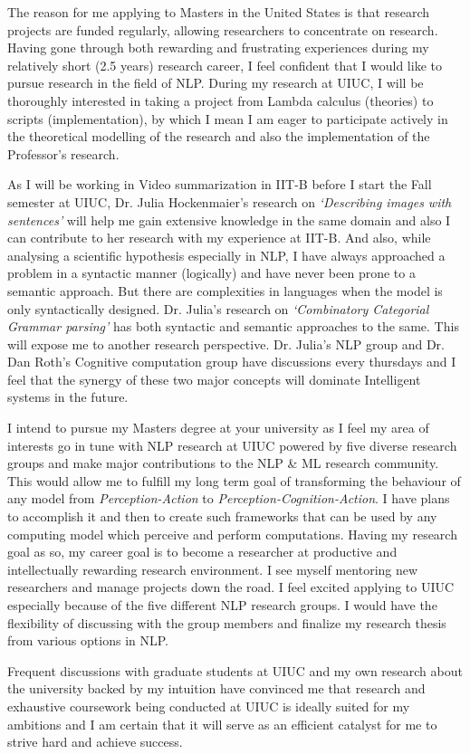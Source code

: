 \documentclass[letterpaper]{article}
\begin{document}
The reason for me applying to Masters in the United States is that research projects are funded regularly, allowing researchers to concentrate on research. Having gone through both rewarding and frustrating experiences during my relatively short (2.5 years) research career, I feel confident that I would like to pursue research in the field of NLP. During my research at UIUC, I will be thoroughly interested in taking a project from Lambda calculus (theories) to scripts (implementation), by which I mean I am eager to participate actively in the theoretical modelling of the research and also the implementation of the Professor's research.\\ \par


As I will be working in Video summarization in IIT-B before I start the Fall semester at UIUC, Dr. Julia Hockenmaier’s research on \textit{‘Describing images with sentences’} will help me gain extensive knowledge in the same domain and also I can contribute to her research with my experience at IIT-B. And also, while analysing a scientific hypothesis especially in NLP, I have always approached a problem in a syntactic manner (logically) and have never been prone to a semantic approach. But there are complexities in languages when the model is only syntactically designed. Dr. Julia’s research on \textit{‘Combinatory Categorial Grammar parsing’} has both syntactic and semantic approaches to the same. This will expose me to another research perspective. Dr. Julia’s  NLP group and Dr. Dan Roth’s Cognitive computation group have discussions every thursdays and I feel that the synergy of these two major concepts will dominate Intelligent systems in the future.\\ \par


I intend to pursue my Masters degree at your university as I feel my area of interests go in tune with NLP research at UIUC powered by five diverse research groups and make major contributions to the NLP \& ML research community. This would allow me to fulfill my long term goal of transforming the behaviour of any model from \textit{Perception-Action} to \textit{Perception-Cognition-Action}. I have plans to accomplish it and then to create such frameworks that can be used by any computing model which perceive and perform computations. Having my research goal as so, my career goal is to become a researcher at productive and intellectually rewarding research environment. I see myself mentoring new researchers and manage projects down the road. I feel excited applying to UIUC especially because of the five different NLP research groups. I would have the flexibility of discussing with the group members and finalize my research thesis from various options in NLP.\\ \par


Frequent discussions with graduate students at UIUC and  my own research about the university backed by my intuition have convinced me that research and exhaustive coursework being conducted at UIUC is ideally suited for my ambitions and I am certain that it will serve as an efficient catalyst for me to strive hard and achieve success.
\end{document}
